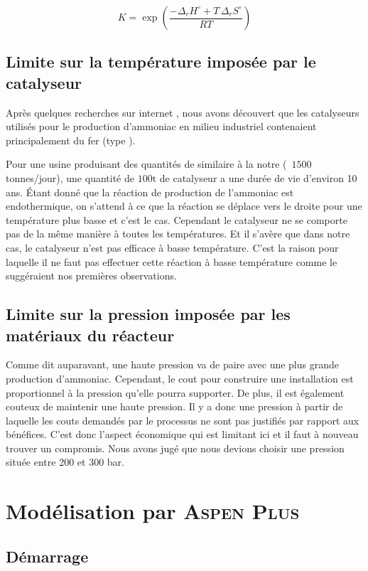 \[
K = \exp{\left( \frac{- \Delta_r H^{\circ} + T \, \Delta_r S^{\circ}}{R T}\right)}
\]

\subsection{Limite sur la température imposée par le catalyseur}

Après quelques recherches sur internet \cite{catalyseur}, 
nous avons découvert que les catalyseurs utilisés
pour le production d'ammoniac en milieu industriel 
contenaient principalement du fer (type ). 

Pour une usine produisant des quantités de  similaire à la notre (~$1500$ tonnes/jour), 
une quantité de $100\si{\tonne}$ de catalyseur a une durée de vie d'environ 10 ans. 
Étant donné que la réaction de production de l'ammoniac est endothermique,
on s'attend à ce que la réaction se déplace vers le droite 
pour une température plus basse et c'est le cas.
Cependant le catalyseur ne se comporte pas de la m\^eme manière à toutes les températures. 
Et il s'avère que dans notre cas,
le catalyseur n'est pas efficace à basse température. 
C'est la raison pour laquelle il ne faut pas effectuer
cette réaction à basse température comme le suggéraient nos premières observations.

\subsection{Limite sur la pression imposée par les matériaux du réacteur}

Comme dit auparavant, une haute pression va de paire avec une plus grande production d'ammoniac.
Cependant, le cout pour construire une installation est proportionnel à la pression qu'elle pourra
supporter. 
De plus, il est également couteux de maintenir une haute pression. 
Il y a donc une pression à partir de laquelle les couts demandés par le processus ne sont pas justifiés par rapport aux bénéfices. 
C'est donc l'aspect économique qui est limitant ici et il faut à nouveau trouver un compromis.
Nous avons jugé que nous devions choisir une pression située entre 200 et 300 bar.


\section{Modélisation par \textsc{Aspen Plus}}
\subsection{Démarrage}


